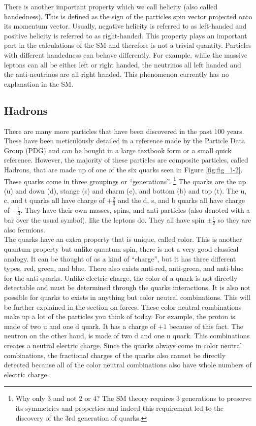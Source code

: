 There is another important property which we call helicity (also called handedness). This is defined as the sign of the particles spin vector projected onto its momentum vector.
Usually, negative helicity is referred to as left-handed and positive helicity is referred to as right-handed. This property plays an important part in the calculations of the SM and therefore is not a trivial quantity.
Particles with different handedness can behave differently. For example, while the massive leptons can all be either left or right handed, the neutrinos all left handed and the anti-neutrinos are all right handed.
This phenomenon currently has no explanation in the SM.

\subsection{Hadrons}
There are many more particles that have been discovered in the past 100 years. These have been meticulously detailed in a reference made by the Particle Data Group (PDG) and can be bought in a large textbook form or a small quick reference. 
However, the majority of these particles are composite particles, called Hadrons, that are made up of one of the six quarks seen in Figure \ref{fig:fig_1-2}.
These quarks come in three groupings or ``generations''. \footnote{Why only 3 and not 2 or 4? The SM theory requires 3 generations to preserve its symmetries and properties and indeed this requirement led to the discovery of the 3rd generation of quarks.}
The quarks are the up (u) and down (d), stange (s) and charm (c), and bottom (b) and top (t). The u, c, and t quarks all have charge of $+ \frac{2}{3}$ and the d, s, and b quarks all have charge of $-\frac{1}{3}$.
They have their own masses, spins, and anti-particles (also denoted with a bar over the usual symbol), like the leptons do. They all have spin $\pm \frac{1}{2}$ so they are also fermions.\\

The quarks have an extra property that is unique, called color. This is another quantum property but unlike quantum spin, there is not a very good classical analogy.
It can be thought of as a kind of ``charge'', but it has three different types, red, green, and blue. There also exists anti-red, anti-green, and anti-blue for the anti-quarks.
Unlike electric charge, the color of a quark is not directly detectable and must be determined through the quarks interactions. 
It is also not possible for quarks to exists in anything but color neutral combinations. This will be further explained in the section on forces.
These color neutral combinations make up a lot of the particles you think of today. For example, the proton is made of two u and one d quark. It has a charge of $+1$ because of this fact.
The neutron on the other hand, is made of two d and one u quark. This combinations creates a neutral electric charge. 
Since the quarks always come in color neutral combinations, the fractional charges of the quarks also cannot be directly detected because all of the color neutral combinations also have whole numbers of electric charge.

